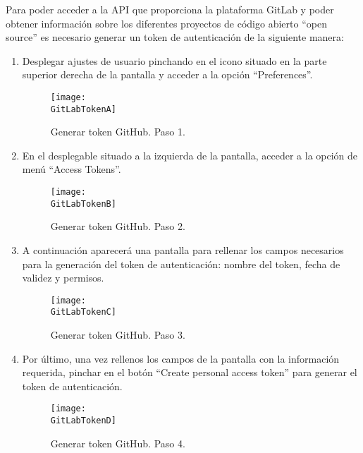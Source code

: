 Para poder acceder a la API que proporciona la plataforma GitLab y poder obtener información sobre los diferentes proyectos de código abierto ``open source'' es necesario generar un token de autenticación de la siguiente manera:

\begin{enumerate}
    \item Desplegar ajustes de usuario pinchando en el icono situado en la parte superior derecha de la pantalla y acceder a la opción ``Preferences''.

    \begin{figure}[h]
        \centering
        \texttt{[image: \\GitLabTokenA]}
        \caption{Generar token GitHub. Paso 1.}
    \end{figure}

    \newpage

    \item En el desplegable situado a la izquierda de la pantalla, acceder a la opción de menú ``Access Tokens''.

    \begin{figure}[h]
        \centering
        \texttt{[image: \\GitLabTokenB]}
        \caption{Generar token GitHub. Paso 2.}
    \end{figure}

    \item A continuación aparecerá una pantalla para rellenar los campos necesarios para la generación del token de autenticación: nombre del token, fecha de validez y permisos.
    
    \begin{figure}[h]
        \centering
        \texttt{[image: \\GitLabTokenC]}
        \caption{Generar token GitHub. Paso 3.}
    \end{figure}

    \newpage

    \item Por último, una vez rellenos los campos de la pantalla con la información requerida, pinchar en el botón ``Create personal access token'' para generar el token de autenticación.

    \begin{figure}[h]
        \centering
        \texttt{[image: \\GitLabTokenD]}
        \caption{Generar token GitHub. Paso 4.}
    \end{figure}

\end{enumerate}